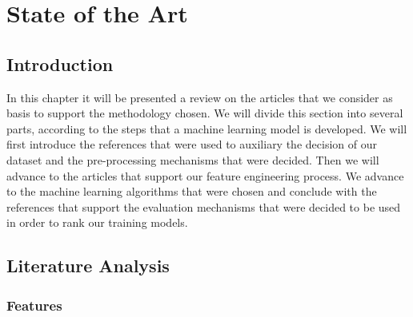 


\chapter{State of the Art}
\label{cha:introduction}


\section{Introduction} 
\label{sub:if_you_use_this_template} 

In this chapter it will be presented a review on the articles that we consider as basis to support the methodology chosen. We will divide this section into several parts, according to the steps that a machine learning model is developed.
We will first introduce the references that were used to auxiliary the decision of our dataset and the pre-processing mechanisms that were decided. Then we will advance to the articles that support our feature engineering process. We advance to the machine learning algorithms that were chosen and conclude with the references that support the evaluation mechanisms that were decided to be used in order to rank our training models.

\section{Literature Analysis}


\subsection{Features}

